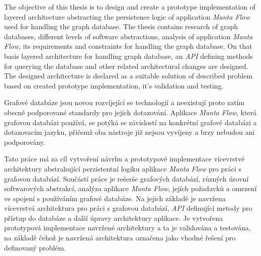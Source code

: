 \documentclass[11pt,twoside,a4paper]{book}
\begin{document}
   The objective of this thesis is to design and create a prototype implementation of layered architecture abstracting the persistence logic of application \textit{Manta Flow} used for handling the graph database.
   The thesis contains research of graph databases, different levels of software abstractions, analysis of application \textit{Manta Flow}, its requirements and constraints for handling the graph database. On that basis layered architecture for handling graph database, an \textit{API} defining methods for querying the database and other related architectural changes are designed. The designed architecture is declared as a suitable solution of described problem based on created prototype implementation, it's validation and testing.


	\baselineskip

	Grafové databáze jsou novou rozvíjející se technologií a neexistují proto zatím obecně podporované standardy pro jejich dotazování. Aplikace \textit{Manta Flow}, která grafovou databázi používá, se potýká se závislostí na konkrétní grafové databázi a dotazovacím jazyku, přičemž oba nástroje již nejsou vyvíjeny a brzy nebudou ani podporovány.

   Tato práce má za cíl vytvoření návrhu a prototypové implementace vícevrstvé architektury abstrahující perzistentní logiku aplikace \textit{Manta Flow} pro práci s grafovou databází.
   Součástí práce je rešerše grafových databází, různých úrovní softwarových abstrakcí, analýza aplikace \textit{Manta Flow}, jejích požadavků a omezení ve spojení s používáním grafové databáze. Na jejich základě je navržena vícevrstvá architektura pro práci s grafovou databází, \textit{API} definující metody pro přístup do databáze a další úpravy architektury aplikace. Je vytvořena prototypová implementace navržené architektury a ta je validována a testována, na základě čehož je navržená architektura označena jako vhodné řešení pro definovaný problém.


	\tableofcontents		%

	\listoffigures			%
	\listoftables			%
	\lstlistoflistings         %

	\mainbodystarts
\end{document}
